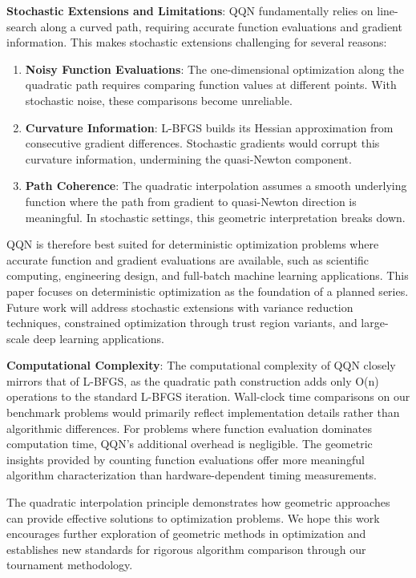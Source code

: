 \textbf{Stochastic Extensions and Limitations}: QQN fundamentally relies on line-search along a curved path, requiring accurate function evaluations and gradient information. This makes stochastic extensions challenging for several reasons:

\begin{enumerate}
\def\labelenumi{\arabic{enumi}.}
\item
  \textbf{Noisy Function Evaluations}: The one-dimensional optimization along the quadratic path requires comparing function values at different points.
  With stochastic noise, these comparisons become unreliable.
\item
  \textbf{Curvature Information}: L-BFGS builds its Hessian approximation from consecutive gradient differences.
  Stochastic gradients would corrupt this curvature information, undermining the quasi-Newton component.
\item
  \textbf{Path Coherence}: The quadratic interpolation assumes a smooth underlying function where the path from gradient to quasi-Newton direction is meaningful.
  In stochastic settings, this geometric interpretation breaks down.
\end{enumerate}

QQN is therefore best suited for deterministic optimization problems where accurate function and gradient evaluations are available, such as scientific computing, engineering design, and full-batch machine learning applications. This paper focuses on deterministic optimization as the foundation of a planned series. Future work will address stochastic extensions with variance reduction techniques, constrained optimization through trust region variants, and large-scale deep learning applications.

\textbf{Computational Complexity}: The computational complexity of QQN closely mirrors that of L-BFGS, as the quadratic path construction adds only O(n) operations to the standard L-BFGS iteration.
Wall-clock time comparisons on our benchmark problems would primarily reflect implementation details rather than algorithmic differences.
For problems where function evaluation dominates computation time, QQN's additional overhead is negligible.
The geometric insights provided by counting function evaluations offer more meaningful algorithm characterization than hardware-dependent timing measurements.

The quadratic interpolation principle demonstrates how geometric approaches can provide effective solutions to optimization problems.
We hope this work encourages further exploration of geometric methods in optimization and establishes new standards for rigorous algorithm comparison through our tournament methodology.

